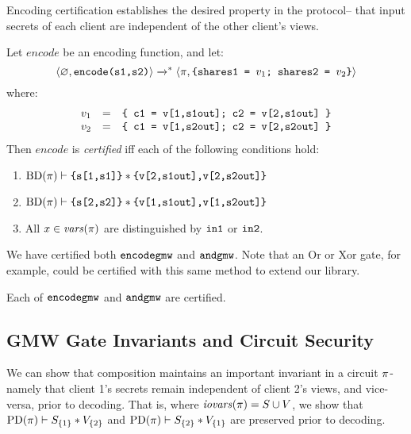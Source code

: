 Encoding certification establishes the desired property in the protocol-- that
input secrets of each client are independent of the other client's views. 
\begin{definition}
  \label{definition-gmwencode-certification}
  Let $\mathit{encode}$ be an encoding function, and let:
  $$
  \langle \varnothing,\texttt{encode(s1,s2)} \rangle \xrightarrow{}^{*}
  \langle \pi,\texttt{\{shares1 = }v_1\texttt{; shares2 = }v_2\texttt{\}} \rangle
  $$
  where:
  $$
  \begin{array}{rcl}
    v_1 &=& \texttt{\{ c1 = v[1,s1out]; c2 = v[2,s1out] \}}\\
    v_2 &=& \texttt{\{ c1 = v[1,s2out]; c2 = v[2,s2out] \}}
  \end{array}
  $$
  Then $\mathit{encode}$ is \emph{certified} iff each of the following conditions hold:
  \begin{enumerate}[\hspace{5mm}i.]
  \item $\mathrm{BD}(\pi) \vdash \texttt{\{s[1,s1]\}} * \texttt{\{v[2,s1out],v[2,s2out]\}}$
  \item $\mathrm{BD}(\pi) \vdash \texttt{\{s[2,s2]\}} * \texttt{\{v[1,s1out],v[1,s2out]\}}$
  \item All $x \in \mathit{vars}(\pi)$ are distinguished by $\texttt{in1}$ or $\texttt{in2}$. 
  \end{enumerate}
  \end{definition}

We have certified both $\texttt{encodegmw}$ and $\texttt{andgmw}$. Note that
an Or or Xor gate, for example, could be certified with this same
method to extend our library.
\begin{lemma}
  \label{lemma-gmw-certification}
  Each of $\texttt{encodegmw}$ and $\texttt{andgmw}$ are certified.
\end{lemma}

\subsection{GMW Gate Invariants and Circuit Security}
We can show that composition maintains an important invariant in a
circuit $\pi$- namely that client 1's secrets remain independent of
client 2's views, and vice-versa, prior to decoding.  That is, where
$\mathit{iovars}(\pi) = S \cup V$, we show that
$\mathrm{PD}(\pi) \vdash S_{\{1\}} * V_{\{2\}}$ and
$\mathrm{PD}(\pi) \vdash S_{\{2\}} * V_{\{1\}}$ are preserved prior to
decoding.

